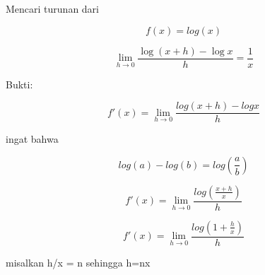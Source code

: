 \documentclass[a4paper,10pt]{article}
\begin{document}
\begin{eulernotebook}
\begin{eulercomment}
\begin{eulercomment}
\begin{eulercomment}
\end{eulercomment}
\begin{eulercomment}
Mencari turunan dari\\
\end{eulercomment}
\begin{eulerformula}
\[
f(x)= log(x)
\]
\end{eulerformula}
\begin{eulerformula}
\[
\lim_{h\rightarrow 0}{\frac{\log \left(x+h\right)-\log x}{h}}=  \frac{1}{x}
\]
\end{eulerformula}
\begin{eulercomment}
Bukti:\\
\end{eulercomment}
\begin{eulerformula}
\[
f'(x) = \lim_{h\to 0} \frac{log(x+h)-log x}{h}
\]
\end{eulerformula}
\begin{eulercomment}
ingat bahwa\\
\end{eulercomment}
\begin{eulerformula}
\[
log(a)-log(b)= log (\frac{a}{b})
\]
\end{eulerformula}
\begin{eulercomment}
\end{eulercomment}
\begin{eulerformula}
\[
f'(x)=\lim_{h\to 0}\frac{log(\frac{x+h}{x})}{h}
\]
\end{eulerformula}
\begin{eulerformula}
\[
f'(x)=\lim_{h\to 0}\frac{log(1 + \frac{h}{x})}{h}
\]
\end{eulerformula}
\begin{eulercomment}
misalkan h/x = n sehingga h=nx


\end{eulercomment}
\end{eulercomment}
\end{eulercomment}
\end{eulernotebook}
\end{document}
